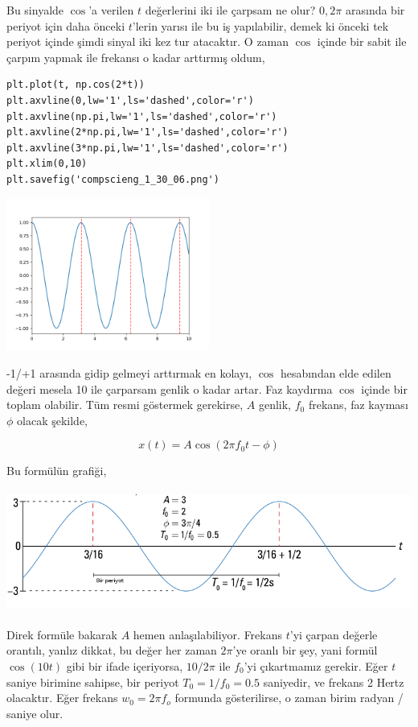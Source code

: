 \documentclass[12pt,fleqn]{article}\usepackage{../../common}
\begin{document}
Bu sinyalde $\cos$'a verilen $t$ değerlerini iki ile çarpsam ne olur?
$0,2\pi$ arasında bir periyot için daha önceki $t$'lerin yarısı ile bu iş
yapılabilir, demek ki önceki tek periyot içinde şimdi sinyal iki kez tur
atacaktır. O zaman $\cos$ içinde bir sabit ile çarpım yapmak ile frekansı o
kadar arttırmış oldum,

\begin{verbatim}
plt.plot(t, np.cos(2*t))
plt.axvline(0,lw='1',ls='dashed',color='r')
plt.axvline(np.pi,lw='1',ls='dashed',color='r')
plt.axvline(2*np.pi,lw='1',ls='dashed',color='r')
plt.axvline(3*np.pi,lw='1',ls='dashed',color='r')
plt.xlim(0,10)
plt.savefig('compscieng_1_30_06.png')
\end{verbatim}

\includegraphics[height=5cm]{compscieng_1_30_06.png}

-1/+1 arasında gidip gelmeyi arttırmak en kolayı, $\cos$ hesabından elde
edilen değeri mesela 10 ile çarparsam genlik o kadar artar. Faz kaydırma
$\cos$ içinde bir toplam olabilir. Tüm resmi göstermek gerekirse, $A$
genlik, $f_0$ frekans, faz kayması $\phi$ olacak şekilde,

$$ 
x(t) = A \cos (2\pi f_0 t - \phi)
$$

Bu formülün grafiği,

\includegraphics[height=4cm]{compscieng_1_30_07.png}

Direk formüle bakarak $A$ hemen anlaşılabiliyor. Frekans $t$'yi çarpan
değerle orantılı, yanlız dikkat, bu değer her zaman $2\pi$'ye oranlı bir
şey, yani formül $\cos(10 t)$ gibi bir ifade içeriyorsa, $10 / 2\pi$ ile
$f_0$'yi çıkartmamız gerekir. Eğer $t$ saniye birimine sahipse, bir periyot
$T_0 = 1/f_0 = 0.5$ saniyedir, ve frekans 2 Hertz olacaktır. Eğer frekans
$w_0 = 2\pi f_o$ formunda gösterilirse, o zaman birim radyan / saniye olur.
\end{document}
